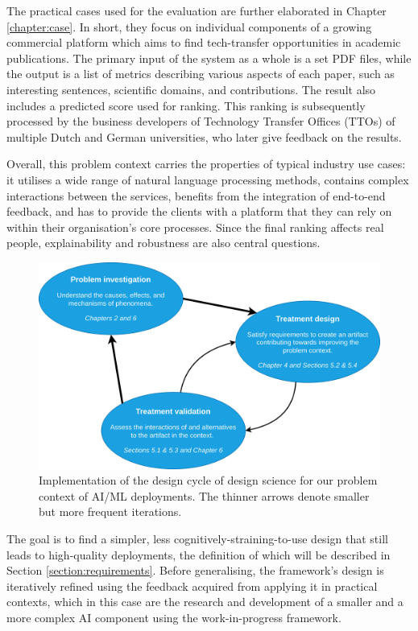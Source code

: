 The practical cases used for the evaluation are further elaborated in Chapter \ref{chapter:case}. In short, they focus on individual components of a growing commercial platform which aims to find tech-transfer opportunities in academic publications. The primary input of the system as a whole is a set PDF files, while the output is a list of metrics describing various aspects of each paper, such as interesting sentences, scientific domains, and contributions. The result also includes a predicted score used for ranking. This ranking is subsequently processed by the business developers of Technology Transfer Offices (TTOs) of multiple Dutch and German universities, who later give feedback on the results.

Overall, this problem context carries the properties of typical industry use cases: it utilises a wide range of natural language processing methods, contains complex interactions between the services, benefits from the integration of end-to-end feedback, and has to provide the clients with a platform that they can rely on within their organisation's core processes. Since the final ranking affects real people, explainability and robustness are also central questions.

\begin{figure}
    \centering
    \includegraphics[width=.9\linewidth]{figures/design-cycle.drawio.png}
    \captionsetup{width=.9\linewidth}
    \caption{Implementation of the design cycle of design science \cite{wieringa2014design} for our problem context of AI/ML deployments. The thinner arrows denote smaller but more frequent iterations.}
    \label{fig:design-cycle}
\end{figure}

The goal is to find a simpler, less cognitively-straining-to-use design that still leads to high-quality deployments, the definition of which will be described in Section \ref{section:requirements}. Before generalising, the framework's design is iteratively refined using the feedback acquired from applying it in practical contexts, which in this case are the research and development of a smaller and a more complex AI component using the work-in-progress framework. 


